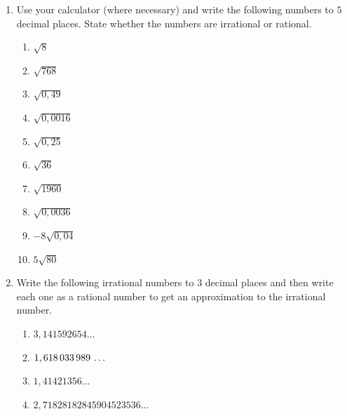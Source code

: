 \begin{eocexercises}{}
\begin{enumerate}[itemsep=5pt, label=\textbf{\arabic*}. ]
\item Use your calculator (where necessary) and write the following numbers to $5$ decimal places. State whether the numbers are irrational or rational.
\begin{multicols}{2}
    \begin{enumerate}[itemsep=5pt, label=\textbf{\alph*}. ] 
    \item $\sqrt{8}$
    \item $\sqrt{768}$
    \item $\sqrt{0,49}$
    \item $\sqrt{0,0016}$
    \item $\sqrt{0,25}$
    \item $\sqrt{36}$
    \item $\sqrt{1960}$
    \item $\sqrt{0,0036}$
    \item $-8\sqrt{0,04}$
    \item $5\sqrt{80}$
    \end{enumerate}
\end{multicols}

\item Write the following irrational numbers to $3$ decimal places and then write each one as a rational number to get an approximation to the irrational number.
\begin{multicols}{2}
\begin{enumerate}[itemsep=5pt, label=\textbf{\alph*}. ] 
    \item $3,141592654\ldots$
    \item $1,618\phantom{\rule{0.166667em}{0ex}}033\phantom{\rule{0.166667em}{0ex}}989\phantom{\rule{0.166667em}{0ex}}\ldots$
    \item $1,41421356\ldots$
    \item $2,71828182845904523536\ldots$
    \end{enumerate}
\end{multicols}




\end{enumerate}
\end{eocexercises}
